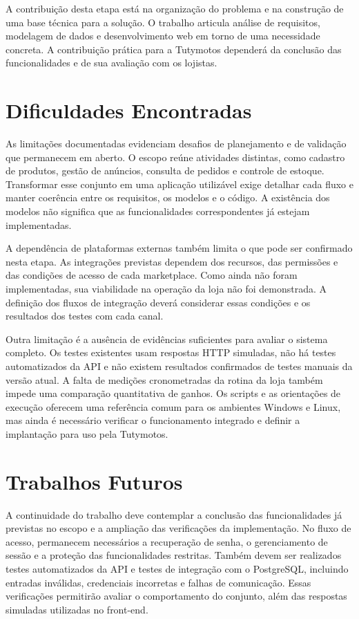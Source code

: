 A contribuição desta etapa está na organização do problema e na construção de uma base técnica para a solução. O trabalho articula análise de requisitos, modelagem de dados e desenvolvimento web em torno de uma necessidade concreta. A contribuição prática para a Tutymotos dependerá da conclusão das funcionalidades e de sua avaliação com os lojistas.

\section{Dificuldades Encontradas}

As limitações documentadas evidenciam desafios de planejamento e de validação que permanecem em aberto. O escopo reúne atividades distintas, como cadastro de produtos, gestão de anúncios, consulta de pedidos e controle de estoque. Transformar esse conjunto em uma aplicação utilizável exige detalhar cada fluxo e manter coerência entre os requisitos, os modelos e o código. A existência dos modelos não significa que as funcionalidades correspondentes já estejam implementadas.

A dependência de plataformas externas também limita o que pode ser confirmado nesta etapa. As integrações previstas dependem dos recursos, das permissões e das condições de acesso de cada marketplace. Como ainda não foram implementadas, sua viabilidade na operação da loja não foi demonstrada. A definição dos fluxos de integração deverá considerar essas condições e os resultados dos testes com cada canal.

Outra limitação é a ausência de evidências suficientes para avaliar o sistema completo. Os testes existentes usam respostas HTTP simuladas, não há testes automatizados da API e não existem resultados confirmados de testes manuais da versão atual. A falta de medições cronometradas da rotina da loja também impede uma comparação quantitativa de ganhos. Os scripts e as orientações de execução oferecem uma referência comum para os ambientes Windows e Linux, mas ainda é necessário verificar o funcionamento integrado e definir a implantação para uso pela Tutymotos.

\section{Trabalhos Futuros}

A continuidade do trabalho deve contemplar a conclusão das funcionalidades já previstas no escopo e a ampliação das verificações da implementação. No fluxo de acesso, permanecem necessários a recuperação de senha, o gerenciamento de sessão e a proteção das funcionalidades restritas. Também devem ser realizados testes automatizados da API e testes de integração com o PostgreSQL, incluindo entradas inválidas, credenciais incorretas e falhas de comunicação. Essas verificações permitirão avaliar o comportamento do conjunto, além das respostas simuladas utilizadas no front-end.

